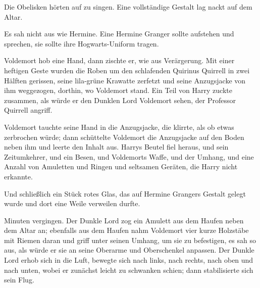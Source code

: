 Die Obelisken hörten auf zu singen. Eine vollständige Gestalt lag nackt auf dem Altar.

Es sah nicht aus wie Hermine. Eine Hermine Granger sollte aufstehen und sprechen, sie sollte ihre Hogwarts-Uniform tragen.

Voldemort hob eine Hand, dann zischte er, wie aus Verärgerung. Mit einer heftigen Geste wurden die Roben um den schlafenden Quirinus Quirrell in zwei Hälften gerissen, seine lila-grüne Krawatte zerfetzt und seine Anzugsjacke von ihm weggezogen, dorthin, wo Voldemort stand. Ein Teil von Harry zuckte zusammen, als würde er den Dunklen Lord Voldemort sehen, der Professor Quirrell angriff.

Voldemort tauchte seine Hand in die Anzugsjacke, die klirrte, als ob etwas zerbrochen würde; dann schüttelte Voldemort die Anzugsjacke auf den Boden neben ihm und leerte den Inhalt aus. Harrys Beutel fiel heraus, und sein Zeitumkehrer, und ein Besen, und Voldemorts Waffe, und der Umhang, und eine Anzahl von Amuletten und Ringen und seltsamen Geräten, die Harry nicht erkannte.

Und schließlich ein Stück rotes Glas, das auf Hermine Grangers Gestalt gelegt wurde und dort eine Weile verweilen durfte.

Minuten vergingen. Der Dunkle Lord zog ein Amulett aus dem Haufen neben dem Altar an; ebenfalls aus dem Haufen nahm Voldemort vier kurze Holzstäbe mit Riemen daran und griff unter seinen Umhang, um sie zu befestigen, es sah so aus, als würde er sie an seine Oberarme und Oberschenkel anpassen.
Der Dunkle Lord erhob sich in die Luft, bewegte sich nach links, nach rechts, nach oben und nach unten, wobei er zunächst leicht zu schwanken schien; dann stabilisierte sich sein Flug.

